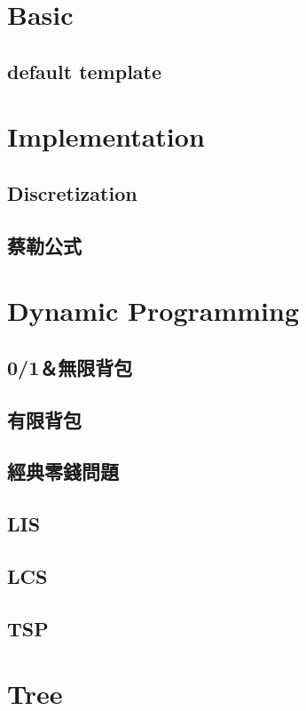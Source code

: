 \section{Basic}
	\subsection{default template}
		
\section{Implementation}
	\subsection{Discretization}
		
	\subsection{蔡勒公式}
		
\section{Dynamic Programming}
	\subsection{0/1＆無限背包}
		
	\subsection{有限背包}
		
	\subsection{經典零錢問題}
		
	\subsection{LIS}
		
	\subsection{LCS}
		
	\subsection{TSP}
		
\section{Tree}
